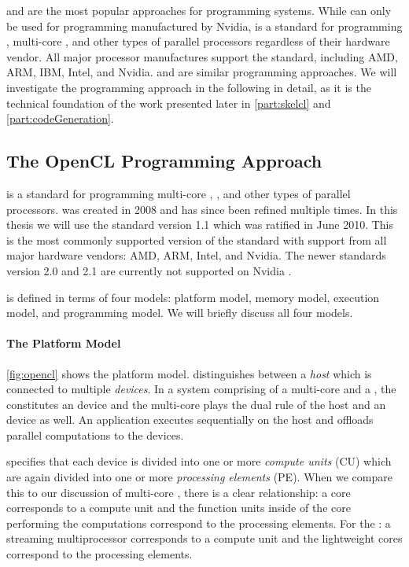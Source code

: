 \CUDA and \OpenCL are the most popular approaches for programming \GPU systems.
While \CUDA can only be used for programming \GPUs manufactured by Nvidia, \OpenCL is a standard for programming \GPUs, multi-core \CPUs, and other types of parallel processors regardless of their hardware vendor.
All major processor manufactures support the \OpenCL standard, including AMD, ARM, IBM, Intel, and Nvidia.
\CUDA and \OpenCL are similar programming approaches.
We will investigate the \OpenCL programming approach in the following in detail, as it is the technical foundation of the work presented later in \autoref{part:skelcl} and \autoref{part:codeGeneration}.


\subsection{The OpenCL Programming Approach}
\OpenCL is a standard for programming multi-core \CPUs, \GPUs, and other types of parallel processors.
\OpenCL was created in 2008 and has since been refined multiple times.
In this thesis we will use the \OpenCL standard version 1.1 which was ratified in June 2010.
This is the most commonly supported version of the standard with support from all major hardware vendors: AMD, ARM, Intel, and Nvidia.
The newer \OpenCL standards version 2.0 and 2.1 are currently not supported on Nvidia \GPUs.

\OpenCL is defined in terms of four models: platform model, memory model, execution model, and programming model.
We will briefly discuss all four models.

\paragraph{The \OpenCL Platform Model}
\autoref{fig:opencl} shows the \OpenCL platform model.
\OpenCL distinguishes between a \emph{host} which is connected to multiple \OpenCL \emph{devices}.
In a system comprising of a multi-core \CPU and a \GPU, the \GPU constitutes an \OpenCL device and the multi-core \CPU plays the dual rule of the host and an \OpenCL device as well.
An \OpenCL application executes sequentially on the host and offloads parallel computations to the \OpenCL devices.

\OpenCL specifies that each device is divided into one or more \emph{compute units} (CU) which are again divided into one or more \emph{processing elements} (PE).
When we compare this to our discussion of multi-core \CPUs, there is a clear relationship:
a \CPU core corresponds to a compute unit and the function units inside of the \CPU core performing the computations correspond to the processing elements.
For the \GPU: a streaming multiprocessor corresponds to a compute unit and the lightweight \GPU cores correspond to the processing elements.

